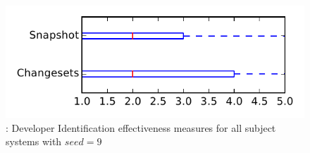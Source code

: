 
\begin{figure}
\centering
\includegraphics[height=0.4\textheight]{figures/dit_seed/rq1_tiny_9}
\caption{\rtwo: Developer Identification effectiveness measures for all subject systems with $seed=9$}
\label{fig:dit_seed:rq1:tiny}
\end{figure}
